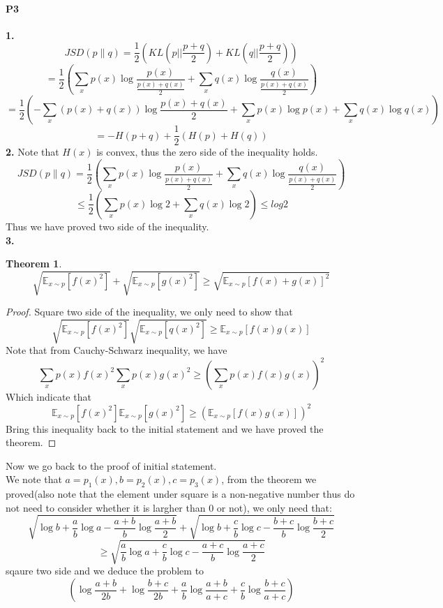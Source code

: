 \documentclass[a4 paper,12pt]{article}
\theoremstyle{definitionstyle}
\newtheorem{thm}{Theorem}
\newenvironment{framedminipage}
    {\begin{framed}\begin{minipage}{0.9\textwidth}}
    {\end{minipage}\end{framed}}
\begin{document}
\paragraph{P3}\textbf{1.}
\[
    JSD(p\|q)=\frac 1 2\left(KL(p||\frac{p+q}{2})+KL(q||\frac{p+q}{2})\right)
\]
\[
    =\frac 1 2 \left(\sum_x p(x)\log\frac{p(x)}{\frac{p(x)+q(x)}{2}}+\sum_x q(x)\log\frac{q(x)}{\frac{p(x)+q(x)}{2}}\right)
\]
\[
    =\frac 1 2 \left(-\sum_x (p(x)+q(x))\log \frac{p(x)+q(x)}{2}+\sum_x p(x)\log p(x)+\sum_x q(x)\log q(x)\right)
\]
\[
    =-H(p+q)+\frac{1}{2}(H(p)+H(q))
\]
\textbf{2.} Note that $H(x)$ is convex, thus the zero side of the inequality holds.
\[
    JSD(p\|q)=\frac 1 2 \left(\sum_x p(x)\log\frac{p(x)}{\frac{p(x)+q(x)}{2}}+\sum_x q(x)\log\frac{q(x)}{\frac{p(x)+q(x)}{2}}\right)
\]
\[
    \le \frac 1 2\left(\sum_x p(x)\log 2+\sum_x q(x)\log 2\right)\le log 2
\]
Thus we have proved two side of the inequality.\\
\textbf{3.}
\begin{framedminipage}
\begin{thm}
\[
    \sqrt{\mathbb{E}_{x\sim p}[f(x)^2]}+\sqrt{\mathbb{E}_{x\sim p}[g(x)^2]}\ge \sqrt{\mathbb{E}_{x\sim p}[f(x)+g(x)]^2}
\]
\end{thm}
\end{framedminipage}
\begin{proof}
Square two side of the inequality, we only need to show that
\[
    \sqrt{\mathbb{E}_{x\sim p}[f(x)^2]}\sqrt{\mathbb{E}_{x\sim p}[q(x)^2]}\ge \mathbb{E}_{x\sim p}[f(x)g(x)]
\]
Note that from Cauchy-Schwarz inequality, we have
\[
    \sum_x p(x)f(x)^2\sum_x p(x)g(x)^2\ge \left(\sum_x p(x)f(x)g(x)\right)^2
\]
Which indicate that
\[
    \mathbb{E}_{x\sim p}[f(x)^2]\mathbb{E}_{x\sim p}[g(x)^2]\ge \left(\mathbb{E}_{x\sim p}[f(x)g(x)]\right)^2
\]
Bring this inequality back to the initial statement and we have proved the theorem.
\end{proof}
Now we go back to the proof of initial statement.\\
We note that $a=p_1(x),b=p_2(x),c=p_3(x)$, from the theorem we proved(also note that the element under square is a non-negative number thus do not need to consider whether it is largher than 0 or not), we only need that:
\[
  \sqrt{\log b+\frac a b\log a-\frac{a+b} b\log\frac{a+b}{2}}+\sqrt{\log b+\frac c b\log c-\frac{b+c} b\log\frac{b+c}{2}}
\]
\[
  \ge \sqrt{\frac a b \log a+\frac c b \log c-\frac{a+c} b\log\frac{a+c}{2}}
\]
sqaure two side and we deduce the problem to 
\[
  \left(\log\frac{a+b}{2b}+\log\frac{b+c}{2b}+\frac a b \log\frac{a+b}{a+c}+\frac c b\log\frac{b+c}{a+c}\right)
\]
\end{document}
